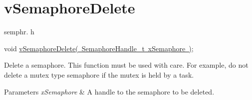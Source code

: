 \hypertarget{group__v_semaphore_delete}{}\section{v\+Semaphore\+Delete}
\label{group__v_semaphore_delete}
semphr. h 
\begin{DoxyPre}void \mbox{\hyperlink{semphr_8h_acd7d0eda0923d7caeeaaee9202c43eab}{vSemaphoreDelete( SemaphoreHandle\_t xSemaphore )}};\end{DoxyPre}


Delete a semaphore. This function must be used with care. For example, do not delete a mutex type semaphore if the mutex is held by a task.


\begin{DoxyParams}{Parameters}
{\em x\+Semaphore} & A handle to the semaphore to be deleted. \\
\hline
\end{DoxyParams}
